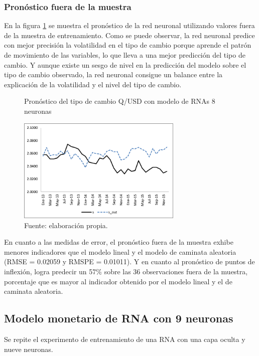 \subsubsection{Pronóstico fuera de la muestra}

En la figura \ref{fig:annout18} se muestra el pronóstico de la red neuronal utilizando valores fuera de la muestra de entrenamiento. Como se puede observar, la red neuronal predice con mejor precisión la volatilidad en el tipo de cambio porque aprende el patrón de movimiento de las variables, lo que lleva a una mejor predicción del tipo de cambio. Y aunque existe un sesgo de nivel en la predicción del modelo sobre el tipo de cambio observado, la red neuronal consigue un balance entre la explicación de la volatilidad y el nivel del tipo de cambio. 

\begin{figure}[htb]
	\centering
	\caption{Pronóstico del tipo de cambio Q/USD con modelo de RNAs 8 neuronas}
	\label{fig:annout18}
	\includegraphics[width=0.7\textwidth]{figuras/ann18_out.png}
	\caption*{Fuente: elaboración propia.}
\end{figure}

En cuanto a las medidas de error, el pronóstico fuera de la muestra exhibe menores indicadores que el modelo lineal y el modelo de caminata aleatoria (RMSE = 0.02059 y RMSPE = 0.01011). Y en cuanto al pronóstico de puntos de inflexión, logra predecir un 57\% sobre las 36 observaciones fuera de la muestra, porcentaje que es mayor al indicador obtenido por el modelo lineal y el de caminata aleatoria.



\subsection{Modelo monetario de RNA con 9 neuronas}
Se repite el experimento de entrenamiento de una RNA con una capa oculta y nueve neuronas.

